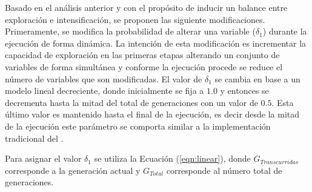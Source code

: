 Basado en el análisis anterior y con el propósito de inducir un balance entre exploración e intensificación, se proponen las siguiente modificaciones.
%
Primeramente, se modifica la probabilidad de alterar una variable ($\delta_1$) durante la ejecución de forma dinámica.
%
La intención de esta modificación es incrementar la capacidad de exploración en las primeras etapas alterando un conjunto de variables de forma simultánea y conforme la ejecución procede se reduce el número de variables que son modificadas.
%
El valor de $\delta_1$ se cambia en base a un modelo lineal decreciente, donde inicialmente se fija a $1.0$ y entonces se decrementa hasta la mitad del total de generaciones con un valor de $0.5$.
%
Esta último valor es mantenido hasta el final de la ejecución, es decir desde la mitad de la ejecución este parámetro se comporta similar a la implementación tradicional del \SBX{}.
%

Para asignar el valor $\delta_1$ se utiliza la Ecuación (\ref{eqn:linear}), donde $G_{Transcurridas}$ corresponde a la generación actual y $G_{Total}$ corresponde al número total de generaciones.

